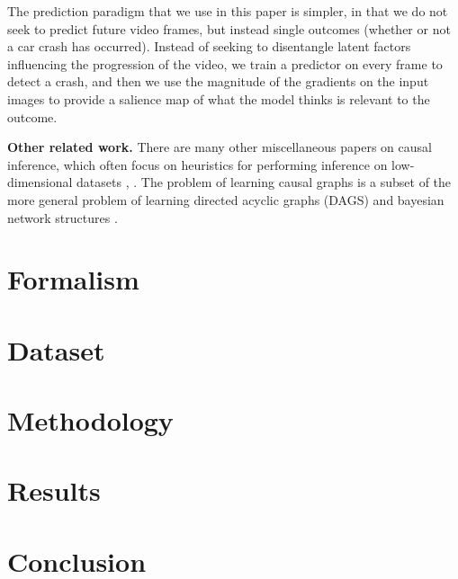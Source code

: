 \documentclass[letterpaper]{article} %
\begin{document}
The prediction paradigm that we use in this paper is simpler, in that we do not seek to predict future video frames, but instead single outcomes (whether or not a car crash has occurred). Instead of seeking to disentangle latent factors influencing the progression of the video, we train a predictor on every frame to detect a crash, and then we use the magnitude of the gradients on the input images to provide a salience map of what the model thinks is relevant to the outcome. %

\noindent \textbf{Other related work.} There are many other miscellaneous papers on causal inference, which often focus on heuristics for performing inference on low-dimensional datasets \cite{veitch2019using}, \cite{rojas2018invariant}. The problem of learning causal graphs is a subset of the more general problem of learning directed acyclic graphs (DAGS) \cite{xie2008recursive} and bayesian network structures \cite{daly2011learning}. %

\section{Formalism}




\section{Dataset}


\section{Methodology}


\section{Results}


\section{Conclusion}























\end{document}

